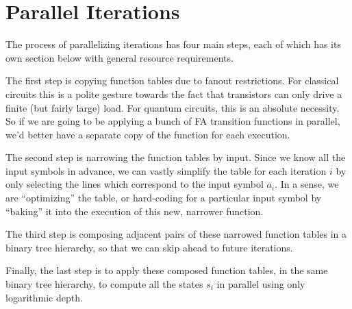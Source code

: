 \section{Parallel Iterations}
\label{sec:pi}

The process of parallelizing iterations has four main steps, each of which
has its own section below with general resource requirements.

The first step is copying function tables due to fanout restrictions.
For classical circuits this is a polite gesture towards the fact that
transistors can only drive a finite (but fairly large) load. For quantum
circuits, this is an absolute necessity. So if we are going to be applying
a bunch of FA transition functions in parallel, we'd better have a separate
copy of the function for each execution.

The second step is narrowing the function tables by input. Since we know all
the input symbols in advance, we can vastly simplify the table for each
iteration $i$ by only selecting the lines which correspond to the input
symbol $a_i$. In a sense, we are ``optimizing'' the table, or hard-coding
for a particular input symbol by ``baking'' it into the execution of this new,
narrower function.

The third step is composing adjacent pairs of these narrowed function tables
in a binary tree hierarchy, so that we can skip ahead to future iterations.

Finally, the last step is to apply these composed function tables, in the
same binary tree hierarchy, to compute all the states $s_i$ in parallel
using only logarithmic depth.









